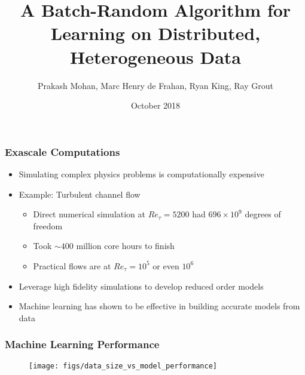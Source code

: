 \documentclass[aspectratio=169]{beamer}
\title[Batch Random Optimizer]{A Batch-Random Algorithm for Learning on Distributed, Heterogeneous Data}
\author[P. Mohan]{Prakash Mohan, Marc Henry de Frahan, Ryan King, Ray Grout}
\date[October 2018]{\small October 2018}
\begin{document}
\begin{frame}
    \titlepage
\end{frame}

\begin{frame}
    \frametitle{Exascale Computations}
    \begin{itemize}
        \item Simulating complex physics problems is computationally expensive
        \item Example: Turbulent channel flow
            \begin{itemize}
                \item Direct numerical simulation at $Re_{\tau} = 5200$ had $696 \times 10^9$ degrees of freedom
                \item Took $\sim400$ million core hours to finish
                \item Practical flows are at $Re_{\tau} = 10^5$ or even $10^6$
            \end{itemize}
        \item Leverage high fidelity simulations to develop reduced order models
        \item Machine learning has shown to be effective in building accurate models from data
    \end{itemize}
\end{frame}
\begin{frame}
    \frametitle{Machine Learning Performance}
    \begin{figure}
        \centering
        \texttt{[image: figs/data\_size\_vs\_model\_performance]}
    \end{figure}
\end{frame}
\end{document}
